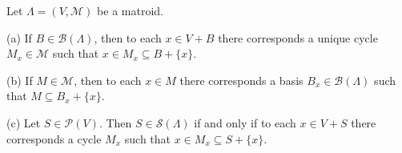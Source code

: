 Let $\Lambda = (V, \mathcal{M})$ be a matroid.

(a) If $B \in \mathcal{B}(\Lambda)$, then to each $x \in V + B$ there corresponds a unique cycle $M_x \in \mathcal{M}$ such that $x \in M_x \subseteq B + \{x\}$.

(b) If $M \in \mathcal{M}$, then to each $x \in M$ there corresponds a basis $B_x \in \mathcal{B}(\Lambda)$ such that $M \subseteq B_x + \{x\}$.

(c) Let $S \in \mathcal{P}(V)$. Then $S \in \mathcal{S}(\Lambda)$ if and only if to each $x \in V + S$ there corresponds a cycle $M_x$ such that $x \in M_x \subseteq S + \{x\}$.
